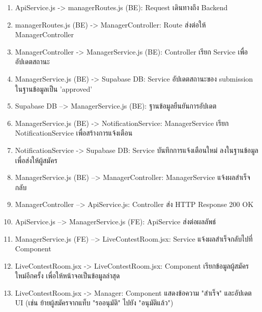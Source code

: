 \begin{sloppypar}
\begin{enumerate}
		\item ApiService.js -> managerRoutes.js (BE): Request เดินทางถึง Backend
		\item managerRoutes.js (BE) -> ManagerController: Route ส่งต่อให้ ManagerController
		\item ManagerController -> ManagerService.js (BE): Controller เรียก Service เพื่ออัปเดตสถานะ
		\item ManagerService.js (BE) -> Supabase DB: Service อัปเดตสถานะของ submission ในฐานข้อมูลเป็น 'approved'
		\item Supabase DB --> ManagerService.js (BE): ฐานข้อมูลยืนยันการอัปเดต
		\item ManagerService.js (BE) -> NotificationService: ManagerService เรียก NotificationService เพื่อสร้างการแจ้งเตือน
		\item NotificationService -> Supabase DB: Service บันทึกการแจ้งเตือนใหม่ ลงในฐานข้อมูลเพื่อส่งให้ผู้สมัคร
		\item ManagerService.js (BE) --> ManagerController: ManagerService แจ้งผลสำเร็จกลับ
		\item ManagerController --> ApiService.js: Controller ส่ง HTTP Response 200 OK
		\item ApiService.js --> ManagerService.js (FE): ApiService ส่งต่อผลลัพธ์
		\item ManagerService.js (FE) --> LiveContestRoom.jsx: Service แจ้งผลสำเร็จกลับไปที่ Component
		\item LiveContestRoom.jsx -> LiveContestRoom.jsx: Component เรียกข้อมูลผู้สมัครใหม่อีกครั้ง เพื่อให้หน้าจอเป็นข้อมูลล่าสุด
		\item LiveContestRoom.jsx -> Manager: Component แสดงข้อความ "สำเร็จ" และอัปเดต UI (เช่น ย้ายผู้สมัครจากแท็บ "รออนุมัติ" ไปยัง "อนุมัติแล้ว")
	\end{enumerate}
\end{sloppypar}
\vspace{\baselineskip}

\endgroup